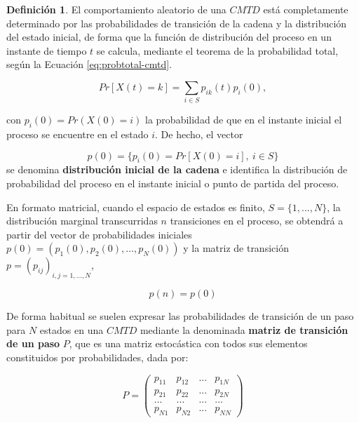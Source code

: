 \documentclass[
]{book}
\newenvironment{yellowbox}{
  \definecolor{shadecolor}{rgb}{210, 180, 140}  
  \color{black}
  \begin{shaded}}
 {\end{shaded}}
\theoremstyle{definition}
\newtheorem{definition}{Definición}[chapter]
\theoremstyle{definition}
\theoremstyle{definition}
\theoremstyle{definition}
\theoremstyle{remark}
\begin{document}
\begin{yellowbox}

\begin{definition}
\protect\hypertarget{def:distriproceso}{}\label{def:distriproceso}El comportamiento aleatorio de una \(CMTD\) está completamente determinado por las probabilidades de transición de la cadena y la distribución del estado inicial, de forma que la función de distribución del proceso en un instante de tiempo \(t\) se calcula, mediante el teorema de la probabilidad total, según la Ecuación \eqref{eq:probtotal-cmtd}.

\begin{equation}
Pr[X(t)= k] =  \sum_{i \in S} p_{ik}(t) p_i(0),
\label{eq:probtotal-cmtd}
\end{equation}

con \(p_i(0) = Pr(X(0) = i)\) la probabilidad de que en el instante inicial el proceso se encuentre en el estado \(i\). De hecho, el vector

\[p(0) = \{p_i(0)= Pr[X(0) = i], \ i \in S\}\]
se denomina \textbf{distribución inicial de la cadena} e identifica la distribución de probabilidad del proceso en el instante inicial o punto de partida del proceso.

En formato matricial, cuando el espacio de estados es finito, \(S=\{1,...,N\}\), la distribución marginal transcurridas \(n\) transiciones en el proceso, se obtendrá a partir del vector de probabilidades iniciales \(p(0) =(p_1(0),p_2(0),\ldots,p_N(0))\) y la matriz de transición \(p=(p_{ij})_{i,j =1,...,N}\),

\begin{equation}
p(n)=p(0) %
\end{equation}
\end{definition}

\end{yellowbox}

De forma habitual se suelen expresar las probabilidades de transición de un paso para \(N\) estados en una \(CMTD\) mediante la denominada \textbf{matriz de transición de un paso} \(P\), que es una matriz estocástica con todos sus elementos constituidos por probabilidades, dada por:

\[P = 
\begin{pmatrix}
p_{11} & p_{12} & ... & p_{1N}\\
p_{21} & p_{22} & ... & p_{2N}\\
... & ... & ... & ...\\
p_{N1} & p_{N2} & ... & p_{NN}
\end{pmatrix}\]
\end{document}
